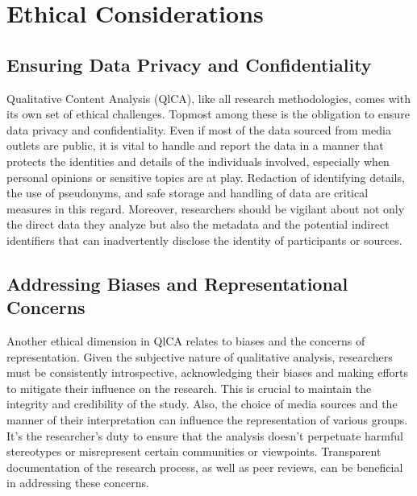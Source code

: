 \documentclass[
  b5paper]{book}
\begin{document}
\hypertarget{ethical-considerations-3}{%
\section{Ethical Considerations}\label{ethical-considerations-3}}

\hypertarget{ensuring-data-privacy-and-confidentiality}{%
\subsection*{Ensuring Data Privacy and Confidentiality}\label{ensuring-data-privacy-and-confidentiality}}

Qualitative Content Analysis (QlCA), like all research methodologies, comes with its own set of ethical challenges. Topmost among these is the obligation to ensure data privacy and confidentiality. Even if most of the data sourced from media outlets are public, it is vital to handle and report the data in a manner that protects the identities and details of the individuals involved, especially when personal opinions or sensitive topics are at play. Redaction of identifying details, the use of pseudonyms, and safe storage and handling of data are critical measures in this regard. Moreover, researchers should be vigilant about not only the direct data they analyze but also the metadata and the potential indirect identifiers that can inadvertently disclose the identity of participants or sources.

\hypertarget{addressing-biases-and-representational-concerns}{%
\subsection*{Addressing Biases and Representational Concerns}\label{addressing-biases-and-representational-concerns}}

Another ethical dimension in QlCA relates to biases and the concerns of representation. Given the subjective nature of qualitative analysis, researchers must be consistently introspective, acknowledging their biases and making efforts to mitigate their influence on the research. This is crucial to maintain the integrity and credibility of the study. Also, the choice of media sources and the manner of their interpretation can influence the representation of various groups. It's the researcher's duty to ensure that the analysis doesn't perpetuate harmful stereotypes or misrepresent certain communities or viewpoints. Transparent documentation of the research process, as well as peer reviews, can be beneficial in addressing these concerns.
\end{document}
